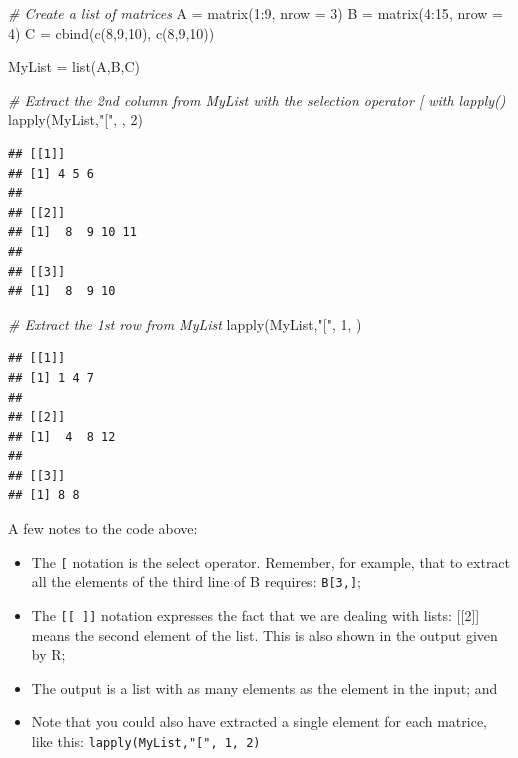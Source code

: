 \documentclass[
]{book}
\newenvironment{Shaded}{\begin{snugshade}}{\end{snugshade}}
\newcommand{\AttributeTok}[1]{\textcolor[rgb]{0.77,0.63,0.00}{#1}}
\newcommand{\CommentTok}[1]{\textcolor[rgb]{0.56,0.35,0.01}{\textit{#1}}}
\newcommand{\DecValTok}[1]{\textcolor[rgb]{0.00,0.00,0.81}{#1}}
\newcommand{\FunctionTok}[1]{\textcolor[rgb]{0.00,0.00,0.00}{#1}}
\newcommand{\NormalTok}[1]{#1}
\newcommand{\OtherTok}[1]{\textcolor[rgb]{0.56,0.35,0.01}{#1}}
\newcommand{\SpecialCharTok}[1]{\textcolor[rgb]{0.00,0.00,0.00}{#1}}
\newcommand{\StringTok}[1]{\textcolor[rgb]{0.31,0.60,0.02}{#1}}
\providecommand{\tightlist}{%
  \setlength{\itemsep}{0pt}\setlength{\parskip}{0pt}}
\begin{document}
\begin{Shaded}
\begin{Highlighting}[]
\CommentTok{\# Create a list of matrices}
\NormalTok{A }\OtherTok{=} \FunctionTok{matrix}\NormalTok{(}\DecValTok{1}\SpecialCharTok{:}\DecValTok{9}\NormalTok{, }\AttributeTok{nrow =} \DecValTok{3}\NormalTok{)}
\NormalTok{B }\OtherTok{=} \FunctionTok{matrix}\NormalTok{(}\DecValTok{4}\SpecialCharTok{:}\DecValTok{15}\NormalTok{, }\AttributeTok{nrow =} \DecValTok{4}\NormalTok{)}
\NormalTok{C }\OtherTok{=} \FunctionTok{cbind}\NormalTok{(}\FunctionTok{c}\NormalTok{(}\DecValTok{8}\NormalTok{,}\DecValTok{9}\NormalTok{,}\DecValTok{10}\NormalTok{), }\FunctionTok{c}\NormalTok{(}\DecValTok{8}\NormalTok{,}\DecValTok{9}\NormalTok{,}\DecValTok{10}\NormalTok{))}

\NormalTok{MyList }\OtherTok{=} \FunctionTok{list}\NormalTok{(A,B,C)}

\CommentTok{\# Extract the 2nd column from \textasciigrave{}MyList\textasciigrave{} with the selection operator \textasciigrave{}[\textasciigrave{} with \textasciigrave{}lapply()\textasciigrave{}}
\FunctionTok{lapply}\NormalTok{(MyList,}\StringTok{"["}\NormalTok{, , }\DecValTok{2}\NormalTok{)}
\end{Highlighting}
\end{Shaded}

\begin{verbatim}
## [[1]]
## [1] 4 5 6
## 
## [[2]]
## [1]  8  9 10 11
## 
## [[3]]
## [1]  8  9 10
\end{verbatim}

\begin{Shaded}
\begin{Highlighting}[]
\CommentTok{\# Extract the 1st row from \textasciigrave{}MyList\textasciigrave{}}
\FunctionTok{lapply}\NormalTok{(MyList,}\StringTok{"["}\NormalTok{, }\DecValTok{1}\NormalTok{, )}
\end{Highlighting}
\end{Shaded}

\begin{verbatim}
## [[1]]
## [1] 1 4 7
## 
## [[2]]
## [1]  4  8 12
## 
## [[3]]
## [1] 8 8
\end{verbatim}

A few notes to the code above:

\begin{itemize}
\tightlist
\item
  The \texttt{{[}} notation is the select operator. Remember, for example, that to extract all the elements of the third line of B requires: \texttt{B{[}3,{]}};
\item
  The \texttt{{[}{[}\ {]}{]}} notation expresses the fact that we are dealing with lists: {[}{[}2{]}{]} means the second element of the list. This is also shown in the output given by R;
\item
  The output is a list with as many elements as the element in the input; and
\item
  Note that you could also have extracted a single element for each matrice, like this: \texttt{lapply(MyList,"{[}",\ 1,\ 2)}
\end{itemize}
\end{document}
